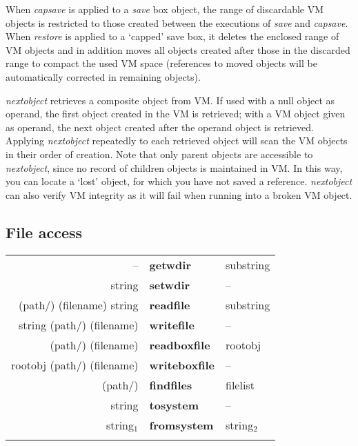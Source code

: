 When \emph{capsave} is applied to a \emph{save} box object, the range of discardable VM objects is restricted to those created between the executions of \emph{save} and \emph{capsave}. When \emph{restore} is applied to a `capped' save box, it deletes the enclosed range of VM objects and in addition moves all objects created after those in the discarded range to compact the used VM space (references to moved objects will be automatically corrected in remaining objects).

\emph{nextobject} retrieves a composite object from VM. If used with a null object as operand, the first object created in the VM is retrieved; with a VM object given as operand, the next object created after the operand object is retrieved. Applying \emph{nextobject} repeatedly to each retrieved object will scan the VM objects in their order of creation. Note that only parent objects are accessible to \emph{nextobject}, since no record of children objects is maintained in VM. In this way, you can locate a `lost' object, for which you have not saved a reference. \emph{nextobject} can also verify VM integrity as it will fail when running into a broken VM object.



\subsection{File access}

\begin{tabular}{>{\sffamily}r>{\sffamily\bfseries}l>{\sffamily}l}
-- & getwdir & substring\\
string & setwdir & --\\
(path/) (filename) string & readfile & substring\\
string (path/) (filename) & writefile & --\\
(path/) (filename) & readboxfile & rootobj\\
rootobj (path/) (filename) & writeboxfile & --\\
(path/) & findfiles & filelist\\
string & tosystem & --\\
string$_1$ & fromsystem & string$_2$\\\\
\end{tabular}



